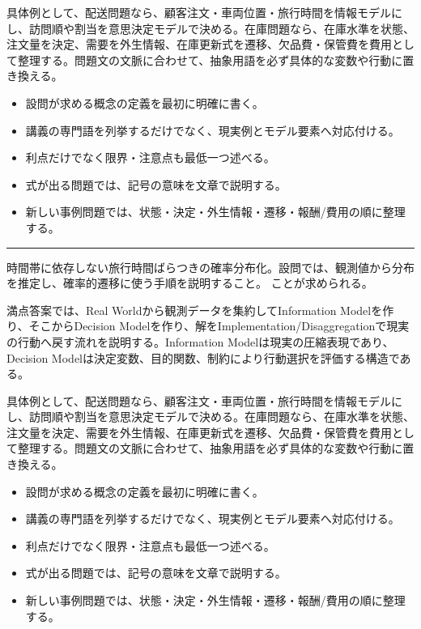 具体例として、配送問題なら、顧客注文・車両位置・旅行時間を情報モデルにし、訪問順や割当を意思決定モデルで決める。在庫問題なら、在庫水準を状態、注文量を決定、需要を外生情報、在庫更新式を遷移、欠品費・保管費を費用として整理する。問題文の文脈に合わせて、抽象用語を必ず具体的な変数や行動に置き換える。\par
{}
\begin{itemize}
\item 設問が求める概念の定義を最初に明確に書く。
\item 講義の専門語を列挙するだけでなく、現実例とモデル要素へ対応付ける。
\item 利点だけでなく限界・注意点も最低一つ述べる。
\item 式が出る問題では、記号の意味を文章で説明する。
\item 新しい事例問題では、状態・決定・外生情報・遷移・報酬/費用の順に整理する。
\end{itemize}
\vspace{2mm}\hrule\vspace{2mm}
時間帯に依存しない旅行時間ばらつきの確率分布化。設問では、観測値から分布を推定し、確率的遷移に使う手順を説明すること。 ことが求められる。\par
{}
満点答案では、Real Worldから観測データを集約してInformation Modelを作り、そこからDecision Modelを作り、解をImplementation/Disaggregationで現実の行動へ戻す流れを説明する。Information Modelは現実の圧縮表現であり、Decision Modelは決定変数、目的関数、制約により行動選択を評価する構造である。\par
{}
具体例として、配送問題なら、顧客注文・車両位置・旅行時間を情報モデルにし、訪問順や割当を意思決定モデルで決める。在庫問題なら、在庫水準を状態、注文量を決定、需要を外生情報、在庫更新式を遷移、欠品費・保管費を費用として整理する。問題文の文脈に合わせて、抽象用語を必ず具体的な変数や行動に置き換える。\par
{}
\begin{itemize}
\item 設問が求める概念の定義を最初に明確に書く。
\item 講義の専門語を列挙するだけでなく、現実例とモデル要素へ対応付ける。
\item 利点だけでなく限界・注意点も最低一つ述べる。
\item 式が出る問題では、記号の意味を文章で説明する。
\item 新しい事例問題では、状態・決定・外生情報・遷移・報酬/費用の順に整理する。
\end{itemize}
